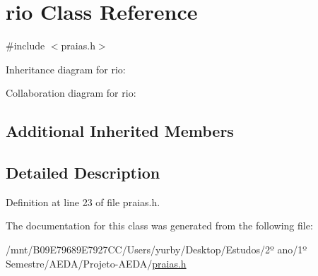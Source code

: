 \hypertarget{classrio}{}\section{rio Class Reference}
\label{classrio}


{\ttfamily \#include $<$praias.\+h$>$}



Inheritance diagram for rio\+:


Collaboration diagram for rio\+:
\subsection*{Additional Inherited Members}


\subsection{Detailed Description}


Definition at line 23 of file praias.\+h.



The documentation for this class was generated from the following file\+:\begin{DoxyCompactItemize}
\item 
/mnt/\+B09\+E79689\+E7927\+C\+C/\+Users/yurby/\+Desktop/\+Estudos/2º ano/1º Semestre/\+A\+E\+D\+A/\+Projeto-\/\+A\+E\+D\+A/\hyperlink{praias_8h}{praias.\+h}\end{DoxyCompactItemize}
